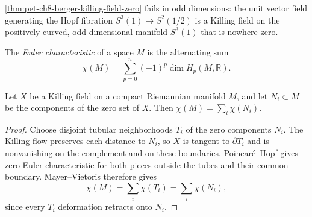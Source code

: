 \begin{remark}
  \label{rem:pet-ch8-berger-odd-dimension-counterexample}
  \cref{thm:pet-ch8-berger-killing-field-zero} fails in odd dimensions: the
  unit vector field generating the Hopf fibration $S^3(1)\to S^2(1/2)$ is a
  Killing field on the positively curved, odd-dimensional manifold $S^3(1)$
  that is nowhere zero.
\end{remark}

\begin{definition}
  \label{def:pet-ch8-euler-characteristic}
  The \emph{Euler characteristic} of a space $M$ is the alternating sum
  \[
    \chi(M)=\sum_{p=0}^n(-1)^p\dim H_p(M,\mathbb{R}).
  \]
\end{definition}

\begin{theorem}
  \label{thm:pet-ch8-euler-characteristic-zero-set-sum}
  Let $X$ be a Killing field on a compact Riemannian manifold $M$, and let
  $N_i\subset M$ be the components of the zero set of $X$. Then
  $\chi(M)=\sum_i\chi(N_i)$.
\end{theorem}
\begin{proof}
  \sketch
  Choose disjoint tubular neighborhoods \(T_i\) of the zero components \(N_i\).
  The Killing flow preserves each distance to \(N_i\), so \(X\) is tangent to
  \(\partial T_i\) and is nonvanishing on the complement and on these
  boundaries. Poincar\'e--Hopf gives zero Euler characteristic for both pieces
  outside the tubes and their common boundary. Mayer--Vietoris therefore gives
  \[
    \chi(M)=\sum_i\chi(T_i)=\sum_i\chi(N_i),
  \]
  since every \(T_i\) deformation retracts onto \(N_i\).
\end{proof}

